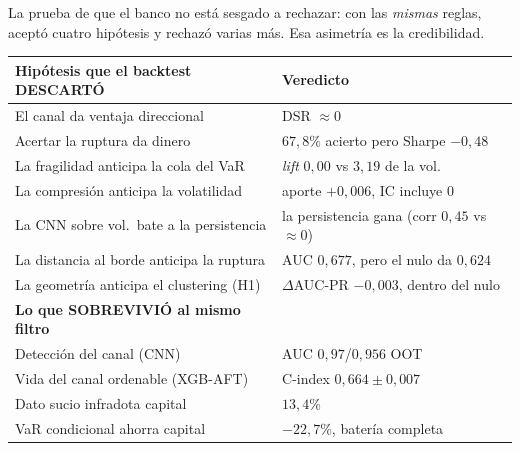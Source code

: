 \documentclass[11pt,a4paper]{article}
\begin{document}
\noindent La prueba de que el banco no está sesgado a rechazar: con las
\emph{mismas} reglas, aceptó cuatro hipótesis y rechazó varias más. Esa asimetría
es la credibilidad.

\begin{table}[H]\centering\footnotesize
\begin{tabularx}{\linewidth}{L l}
\toprule
\textbf{Hipótesis que el backtest DESCARTÓ} & \textbf{Veredicto}\\
\midrule
El canal da ventaja direccional            & DSR $\approx 0$\\
Acertar la ruptura da dinero               & $67{,}8\%$ acierto pero Sharpe $-0{,}48$\\
La fragilidad anticipa la cola del VaR     & \emph{lift} $0{,}00$ vs $3{,}19$ de la vol.\\
La compresión anticipa la volatilidad      & aporte $+0{,}006$, IC incluye 0\\
La CNN sobre vol.\ bate a la persistencia  & la persistencia gana (corr $0{,}45$ vs $\approx 0$)\\
La distancia al borde anticipa la ruptura  & AUC $0{,}677$, pero el nulo da $0{,}624$\\
La geometría anticipa el clustering (H1)   & $\Delta$AUC-PR $-0{,}003$, dentro del nulo\\
\midrule
\textbf{Lo que SOBREVIVIÓ al mismo filtro} & \\
\midrule
Detección del canal (CNN)                  & AUC $0{,}97$/$0{,}956$ OOT\\
Vida del canal ordenable (XGB-AFT)         & C-index $0{,}664\pm0{,}007$\\
Dato sucio infradota capital               & $13{,}4\%$\\
VaR condicional ahorra capital             & $-22{,}7\%$, batería completa\\
\bottomrule
\end{tabularx}
\end{table}

\end{document}
